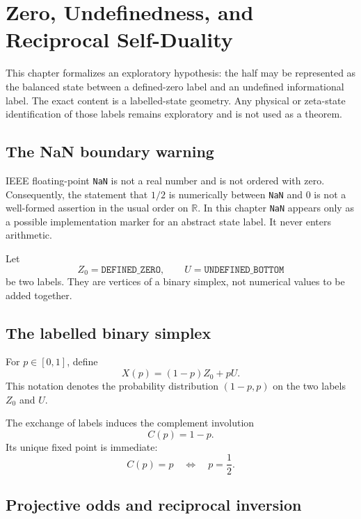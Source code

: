 \chapter{Zero, Undefinedness, and Reciprocal Self-Duality}
\label{ch:zero-undefined}

This chapter formalizes an exploratory hypothesis: the half may be represented as
the balanced state between a defined-zero label and an undefined informational
label. The exact content is a labelled-state geometry. Any physical or zeta-state
identification of those labels remains exploratory and is not used as a theorem.

\section{The NaN boundary warning}

\begin{warning}
IEEE floating-point \texttt{NaN} is not a real number and is not ordered with
zero. Consequently, the statement that $1/2$ is numerically between
\texttt{NaN} and $0$ is not a well-formed assertion in the usual order on
$\mathbb R$. In this chapter \texttt{NaN} appears only as a possible
implementation marker for an abstract state label. It never enters arithmetic.
\end{warning}

Let
\[
 Z_0=\texttt{DEFINED\_ZERO},
 \qquad
 U=\texttt{UNDEFINED\_BOTTOM}
\]
be two labels. They are vertices of a binary simplex, not numerical values to
be added together.

\section{The labelled binary simplex}

\begin{definition}
For $p\in[0,1]$, define
\[
 X(p)=(1-p)Z_0+pU.
\]
This notation denotes the probability distribution $(1-p,p)$ on the two
labels $Z_0$ and $U$.
\end{definition}

The exchange of labels induces the complement involution
\[
 C(p)=1-p.
\]
Its unique fixed point is immediate:
\[
 C(p)=p
 \quad\Longleftrightarrow\quad
 p=\frac12.
\]

\section{Projective odds and reciprocal inversion}

